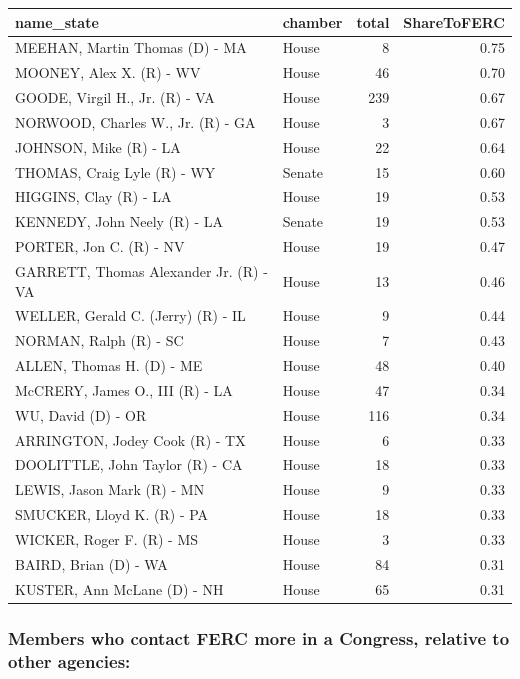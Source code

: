 \documentclass[]{article}
\begin{document}
\begin{longtable}[]{@{}llrr@{}}
\toprule
name\_state & chamber & total & ShareToFERC\tabularnewline
\midrule
\endhead
MEEHAN, Martin Thomas (D) - MA & House & 8 & 0.75\tabularnewline
MOONEY, Alex X. (R) - WV & House & 46 & 0.70\tabularnewline
GOODE, Virgil H., Jr. (R) - VA & House & 239 & 0.67\tabularnewline
NORWOOD, Charles W., Jr. (R) - GA & House & 3 & 0.67\tabularnewline
JOHNSON, Mike (R) - LA & House & 22 & 0.64\tabularnewline
THOMAS, Craig Lyle (R) - WY & Senate & 15 & 0.60\tabularnewline
HIGGINS, Clay (R) - LA & House & 19 & 0.53\tabularnewline
KENNEDY, John Neely (R) - LA & Senate & 19 & 0.53\tabularnewline
PORTER, Jon C. (R) - NV & House & 19 & 0.47\tabularnewline
GARRETT, Thomas Alexander Jr. (R) - VA & House & 13 &
0.46\tabularnewline
WELLER, Gerald C. (Jerry) (R) - IL & House & 9 & 0.44\tabularnewline
NORMAN, Ralph (R) - SC & House & 7 & 0.43\tabularnewline
ALLEN, Thomas H. (D) - ME & House & 48 & 0.40\tabularnewline
McCRERY, James O., III (R) - LA & House & 47 & 0.34\tabularnewline
WU, David (D) - OR & House & 116 & 0.34\tabularnewline
ARRINGTON, Jodey Cook (R) - TX & House & 6 & 0.33\tabularnewline
DOOLITTLE, John Taylor (R) - CA & House & 18 & 0.33\tabularnewline
LEWIS, Jason Mark (R) - MN & House & 9 & 0.33\tabularnewline
SMUCKER, Lloyd K. (R) - PA & House & 18 & 0.33\tabularnewline
WICKER, Roger F. (R) - MS & House & 3 & 0.33\tabularnewline
BAIRD, Brian (D) - WA & House & 84 & 0.31\tabularnewline
KUSTER, Ann McLane (D) - NH & House & 65 & 0.31\tabularnewline
\bottomrule
\end{longtable}

\subsubsection{Members who contact FERC more in a Congress, relative to
other
agencies:}\label{members-who-contact-ferc-more-in-a-congress-relative-to-other-agencies}
\end{document}
